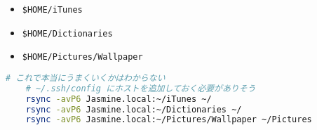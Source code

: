 \documentclass[b5j,titlepage]{ltjsarticle}
\begin{document}
			\begin{itemize}
				\item{\texttt{\$HOME/iTunes}}
				\item{\texttt{\$HOME/Dictionaries}}
				\item{\texttt{\$HOME/Pictures/Wallpaper}}
			\end{itemize}
	
			\begin{lstlisting}[language=bash]
	# これで本当にうまくいくかはわからない
	# ~/.ssh/config にホストを追加しておく必要がありそう
	rsync -avP6 Jasmine.local:~/iTunes ~/
	rsync -avP6 Jasmine.local:~/Dictionaries ~/
	rsync -avP6 Jasmine.local:~/Pictures/Wallpaper ~/Pictures
			\end{lstlisting}

	\clearpage
\end{document}

